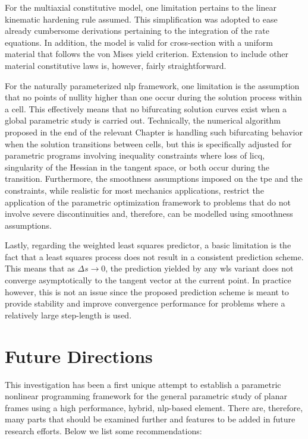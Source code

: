 For the multiaxial constitutive model, one limitation pertains to the linear 
kinematic 
hardening rule assumed. This simplification was adopted to ease already 
cumbersome 
derivations 
pertaining to the integration of the rate equations. In addition, the model is 
valid 
for cross-section with a uniform material that follows the von Mises yield 
criterion. 
Extension to include other material constitutive laws is, however, fairly 
straightforward.

For the naturally parameterized \acrshort{nlp} framework, one limitation is the 
assumption that no points of nullity higher than one occur during the solution 
process 
within a cell. This effectively means that no bifurcating solution curves exist 
when a 
global parametric study is carried out. Technically, the numerical algorithm 
proposed 
in the end of the relevant Chapter is handling such bifurcating behavior when 
the 
solution transitions between cells, but this is specifically adjusted for 
parametric 
programs involving inequality constraints where loss of \acrshort{licq}, 
singularity 
of the Hessian in the tangent space, or both occur during the transition. 
Furthermore, 
the smoothness assumptions imposed on the \acrshort{tpe} and the constraints, 
while 
realistic for most mechanics applications, restrict the application of the 
parametric optimization framework to problems that do not involve severe 
discontinuities and, therefore, can be modelled using smoothness assumptions.

Lastly, regarding the weighted least squares predictor, a basic limitation is 
the fact 
that a least squares process does not result in a consistent prediction scheme. 
This 
means that as $\Delta s\rightarrow 0$, the prediction yielded by any 
\acrshort{wls} 
variant does not converge asymptotically to the tangent vector at the current 
point. 
In practice however, this is not an issue since the proposed prediction scheme 
is 
meant to provide stability and improve convergence performance for problems 
where a 
relatively large step-length is used. 


\section{Future Directions}
This investigation has been a first unique attempt to establish a parametric 
nonlinear 
programming framework for the general parametric study of planar frames using a 
high 
performance, hybrid, \acrshort{nlp}-based element. There are, therefore, many 
parts 
that should be examined further and features to be added in future research 
efforts. 
Below we list some recommendations:

